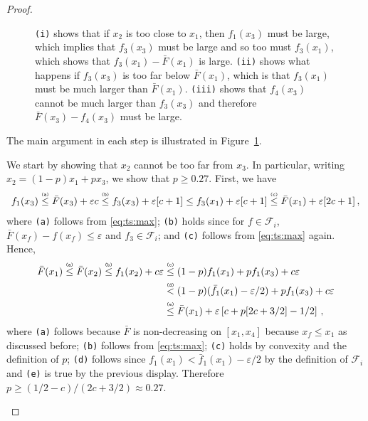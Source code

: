 \documentclass[letter, 12pt]{report}
\newcommand{\explan}[1]{\stackrel{\text{\tiny \texttt{#1}}}}
\newcommand{\sF}{\mathscr F}
\newcommand{\1}{\mathbf{1}}
\renewcommand{\epsilon}{\varepsilon}
\theoremstyle{plain}
\theoremstyle{definition}
\theoremstyle{remark}
\begin{document}
\begin{proof}
\begin{figure}[t]
        \caption{
            \texttt{(i)} shows that if $x_2$ is too close to $x_1$, then $f_1(x_3)$ must be large, which implies that $f_3(x_3)$ must be large
            and so too must $f_3(x_1)$, which shows that $f_3(x_1) - \bar F(x_1)$ is large.
            \texttt{(ii)} shows what happens if $f_3(x_3)$ is too far below $\bar F(x_1)$, which is that $f_3(x_1)$ must be much larger than $\bar F(x_1)$.
            \texttt{(iii)} shows that $f_4(x_3)$ cannot be much larger than $f_3(x_3)$ and therefore $\bar F(x_3) - f_4(x_3)$ must be large.
        }
        \label{fig:ts}
    \end{figure}
    The main argument in each step is illustrated in Figure~\ref{fig:ts}.
    \begin{enumsteps}
        \item \label{step:ts:i} We start by showing that $x_2$ cannot be too far from $x_3$.
        In particular, writing $x_2 = (1-p)x_1 + p x_3$, we show that $p \geq 0.27$.
        First, we have
        \begin{align*}
            f_1(x_3)
            \explan{(a)}\leq \bar F(x_3) + \epsilon c
            \explan{(b)}\leq f_3(x_3) + \epsilon[c+1] \leq f_3(x_1) + \epsilon[c+1]
            \explan{(c)}\leq \bar F(x_1) + \epsilon[2c+1] \,,
        \end{align*}
        where \texttt{(a)} follows from \cref{eq:ts:max};
        \texttt{(b)} holds since for $f \in \sF_i$, $\bar F(x_f) - f(x_f) \leq \epsilon$ and $f_3 \in \sF_i$;
        and \texttt{(c)} follows from \cref{eq:ts:max} again.
        Hence,
        \begin{align*}
            \bar F(x_1)
            \explan{(a)}\leq \bar F(x_2)
            \explan{(b)}\leq f_1(x_2) + c\epsilon
             & \explan{(c)}\leq (1 - p) f_1(x_1) + p f_1(x_3) + c\epsilon                    \\
             & \explan{(d)} < (1 - p) (\bar f_1(x_1) - \epsilon/2) + p f_1(x_3) + c\epsilon  \\
             & \explan{(e)}\leq \bar F(x_1) + \epsilon\left[c + p[2c + 3/2] - 1/2\right] \,,
        \end{align*}
        where \texttt{(a)} follows because $\bar F$ is non-decreasing on $[x_1,x_4]$
        because $x_f \leq x_1$ as discussed before;
        \texttt{(b)} follows from \cref{eq:ts:max};
        \texttt{(c)} holds by convexity and the definition of $p$;
        \texttt{(d)} follows since $f_1(x_1) < \bar f_1(x_1) - \epsilon/2$ by the definition of $\sF_i$ and
        \texttt{(e)} is true by the previous display.
        Therefore $p \geq (1/2 - c) / (2c + 3/2) \approx 0.27$.


\end{enumsteps}
\end{proof}
\end{document}
